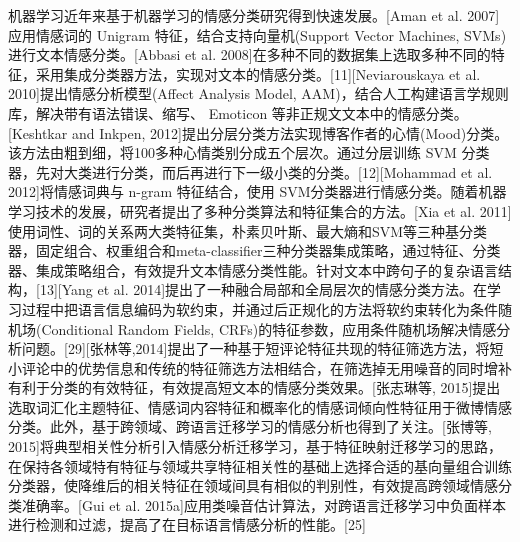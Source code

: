 机器学习近年来基于机器学习的情感分类研究得到快速发展。[Aman et al. 2007]应用情感词的 Unigram 特征，结合支持向量机(Support Vector Machines, SVMs)进行文本情感分类。[Abbasi et al. 2008]在多种不同的数据集上选取多种不同的特征，采用集成分类器方法，实现对文本的情感分类。[11][Neviarouskaya et al. 2010]提出情感分析模型(Affect Analysis Model, AAM)，结合人工构建语言学规则库，解决带有语法错误、缩写、 Emoticon 等非正规文文本中的情感分类。[Keshtkar and Inkpen, 2012]提出分层分类方法实现博客作者的心情(Mood)分类。该方法由粗到细，将100多种心情类别分成五个层次。通过分层训练 SVM 分类器，先对大类进行分类，而后再进行下一级小类的分类。[12][Mohammad et al. 2012]将情感词典与 n-gram 特征结合，使用 SVM分类器进行情感分类。随着机器学习技术的发展，研究者提出了多种分类算法和特征集合的方法。[Xia et al. 2011]使用词性、词的关系两大类特征集，朴素贝叶斯、最大熵和SVM等三种基分类器，固定组合、权重组合和meta-classifier三种分类器集成策略，通过特征、分类器、集成策略组合，有效提升文本情感分类性能。针对文本中跨句子的复杂语言结构，[13][Yang et al. 2014]提出了一种融合局部和全局层次的情感分类方法。在学习过程中把语言信息编码为软约束，并通过后正规化的方法将软约束转化为条件随机场(Conditional Random Fields, CRFs)的特征参数，应用条件随机场解决情感分析问题。[29][张林等,2014]提出了一种基于短评论特征共现的特征筛选方法，将短小评论中的优势信息和传统的特征筛选方法相结合，在筛选掉无用噪音的同时增补有利于分类的有效特征，有效提高短文本的情感分类效果。[张志琳等, 2015]提出选取词汇化主题特征、情感词内容特征和概率化的情感词倾向性特征用于微博情感分类。此外，基于跨领域、跨语言迁移学习的情感分析也得到了关注。[张博等, 2015]将典型相关性分析引入情感分析迁移学习，基于特征映射迁移学习的思路，在保持各领域特有特征与领域共享特征相关性的基础上选择合适的基向量组合训练分类器，使降维后的相关特征在领域间具有相似的判别性，有效提高跨领域情感分类准确率。[Gui et al. 2015a]应用类噪音估计算法，对跨语言迁移学习中负面样本进行检测和过滤，提高了在目标语言情感分析的性能。[25]

